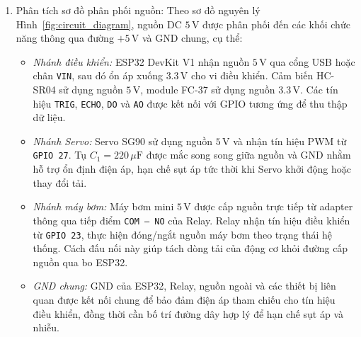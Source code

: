 \begin{enumerate}
    \item Phân tích sơ đồ phân phối nguồn:
    Theo sơ đồ nguyên lý Hình~\ref{fig:circuit_diagram}, nguồn DC $5\,\text{V}$ được phân phối đến các khối chức năng thông qua đường $+5\,\text{V}$ và GND chung, cụ thể:
    \begin{itemize}
        \item \textit{Nhánh điều khiển:} ESP32 DevKit V1 nhận nguồn $5\,\text{V}$ qua cổng USB hoặc chân \texttt{VIN}, sau đó ổn áp xuống $3.3\,\text{V}$ cho vi điều khiển. Cảm biến HC-SR04 sử dụng nguồn $5\,\text{V}$, module FC-37 sử dụng nguồn $3.3\,\text{V}$. Các tín hiệu \texttt{TRIG}, \texttt{ECHO}, \texttt{DO} và \texttt{AO} được kết nối với GPIO tương ứng để thu thập dữ liệu.
        \item \textit{Nhánh Servo:} Servo SG90 sử dụng nguồn $5\,\text{V}$ và nhận tín hiệu PWM từ \texttt{GPIO 27}. Tụ $C_1 = 220\,\mu\text{F}$ được mắc song song giữa nguồn và GND nhằm hỗ trợ ổn định điện áp, hạn chế sụt áp tức thời khi Servo khởi động hoặc thay đổi tải.
        \item \textit{Nhánh máy bơm:} Máy bơm mini $5\,\text{V}$ được cấp nguồn trực tiếp từ adapter thông qua tiếp điểm \texttt{COM -- NO} của Relay. Relay nhận tín hiệu điều khiển từ \texttt{GPIO 23}, thực hiện đóng/ngắt nguồn máy bơm theo trạng thái hệ thống. Cách đấu nối này giúp tách dòng tải của động cơ khỏi đường cấp nguồn qua bo ESP32.
        \item \textit{GND chung:} GND của ESP32, Relay, nguồn ngoài và các thiết bị liên quan được kết nối chung để bảo đảm điện áp tham chiếu cho tín hiệu điều khiển, đồng thời cần bố trí đường dây hợp lý để hạn chế sụt áp và nhiễu.
    \end{itemize}


\end{enumerate}
